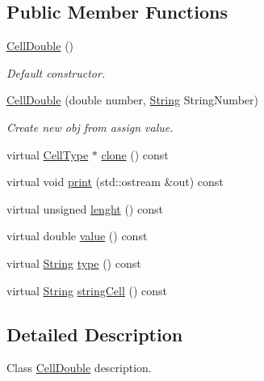 \subsection*{Public Member Functions}
\begin{DoxyCompactItemize}
\item 
\mbox{\label{class_cell_double_a6ae1b712877cd64720282a51acc51d76}} 
\hyperlink{class_cell_double_a6ae1b712877cd64720282a51acc51d76}{Cell\+Double} ()
\begin{DoxyCompactList}\small\item\em Default constructor. \end{DoxyCompactList}\item 
\mbox{\label{class_cell_double_a0f4a236493a840fa3fe89a4ae2dbe1c1}} 
\hyperlink{class_cell_double_a0f4a236493a840fa3fe89a4ae2dbe1c1}{Cell\+Double} (double number, \hyperlink{class_string}{String} String\+Number)
\begin{DoxyCompactList}\small\item\em Create new obj from assign value. \end{DoxyCompactList}\item 
virtual \hyperlink{class_cell_type}{Cell\+Type} $\ast$ \hyperlink{class_cell_double_a8d378687ae89338267e61d61ff932680}{clone} () const
\item 
virtual void \hyperlink{class_cell_double_a90539ceb6daa29e7b658d8f2a2d1445d}{print} (std\+::ostream \&out) const
\item 
virtual unsigned \hyperlink{class_cell_double_ac2d36517f1107fb0271172ea30d6bff5}{lenght} () const
\item 
virtual double \hyperlink{class_cell_double_a6ed39c7b32c0599b4db0f046c7cfab93}{value} () const
\item 
virtual \hyperlink{class_string}{String} \hyperlink{class_cell_double_a73662d15e8626c81858e3a243f0d6818}{type} () const
\item 
virtual \hyperlink{class_string}{String} \hyperlink{class_cell_double_a3e92f9ec4b564b3e14fa829529bbaf0a}{string\+Cell} () const
\end{DoxyCompactItemize}


\subsection{Detailed Description}
Class \hyperlink{class_cell_double}{Cell\+Double} description. 

